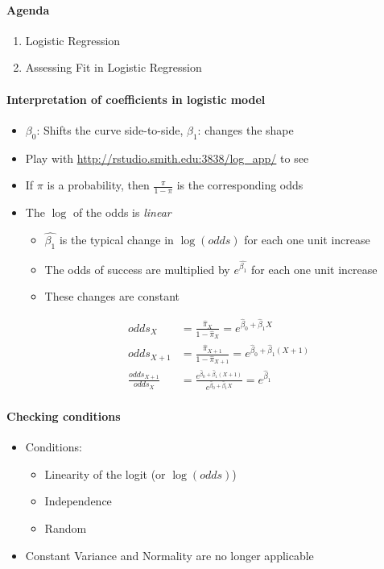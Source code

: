 \documentclass[10pt]{article}\usepackage[]{graphicx}\usepackage[]{color}
\begin{document}
\paragraph{Agenda}
\begin{enumerate}
  \itemsep0em
  \item Logistic Regression
  \item Assessing Fit in Logistic Regression
\end{enumerate}


\paragraph{Interpretation of coefficients in logistic model}
	\begin{itemize}
		\item $\beta_0$: Shifts the curve side-to-side, $\beta_1$: changes the shape
		\item Play with \url{http://rstudio.smith.edu:3838/log_app/} to see
		\item If $\pi$ is a probability, then $\frac{\pi}{1 - \pi}$ is the corresponding odds
		\item The $\log$ of the odds is \emph{linear}
		\begin{itemize}			
			\item $\hat{\beta_1}$ is the typical change in $\log{(odds)}$ for each one unit increase
			\item The odds of success are multiplied by $e^{\hat{\beta_1}}$ for each one unit increase
			\item These changes are constant
		\end{itemize}
		\begin{align*}
			odds_X 		&= \frac{\hat{\pi}_X}{1 - \hat{\pi}_X} = e^{\hat{\beta}_0 + \hat{\beta}_1 X} \\
			odds_{X+1} 	&= \frac{\hat{\pi}_{X+1}}{1 - \hat{\pi}_{X+1}} = e^{\hat{\beta}_0 + \hat{\beta}_1 (X + 1)} \\
			\frac{odds_{X+1}}{odds_X} &= \frac{e^{\hat{\beta}_0 + \hat{\beta}_1 (X + 1)}}{e^{\hat{\beta}_0 + \hat{\beta}_1 X}} = e^{\hat{\beta}_1}
		\end{align*}
	\end{itemize}
	


\paragraph{Checking conditions}
	\begin{itemize}
		\item Conditions:
		\begin{itemize}
			\item Linearity of the logit (or $\log{(odds)}$)
			\item Independence
			\item Random
		\end{itemize}
		\item Constant Variance and Normality are no longer applicable
		\end{itemize}
		
\end{document}
